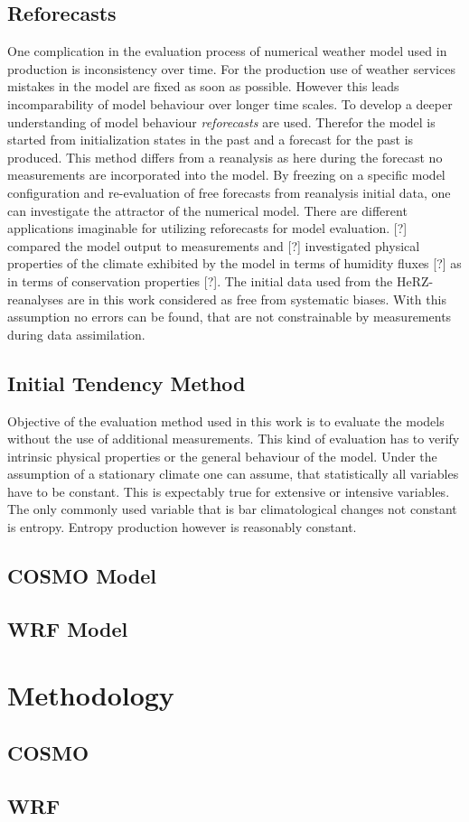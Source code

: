 \section{Reforecasts}
\p
One complication in the evaluation process of numerical weather model used in production is inconsistency over time. For the production use of weather services mistakes in the model are fixed as soon as possible. However this leads incomparability of model behaviour over longer time scales.
\p
To develop a deeper understanding of model behaviour \emph{reforecasts} are used. Therefor the model is started from initialization states in the past and a forecast for the past is produced. This method differs from a reanalysis as here during the forecast no measurements are incorporated into the model.
\p
By freezing on a specific model configuration and re-evaluation of free forecasts from reanalysis initial data, one can investigate the attractor of the numerical model.
\p
There are different applications imaginable for utilizing reforecasts for model evaluation. [?] compared the model output to measurements and [?] investigated physical properties of the climate exhibited by the model in terms of humidity fluxes [?] as in terms of conservation properties [?].
\p
The initial data used from the HeRZ-reanalyses are in this work considered as free from systematic biases. With this assumption no errors can be found, that are not constrainable by measurements during data assimilation. 
\section{Initial Tendency Method}
\p
Objective of the evaluation method used in this work is to evaluate the models without the use of additional measurements. This kind of evaluation has to verify intrinsic physical properties or the general behaviour of the model.
\p
Under the assumption of a stationary climate one can assume, that statistically all variables have to be constant. This is expectably true for extensive or intensive variables. The only commonly used variable that is bar climatological changes  not constant is entropy. Entropy production however is reasonably constant.
\section{COSMO Model}
\section{WRF Model}


\chapter{Methodology}
\section{COSMO}
\section{WRF}
